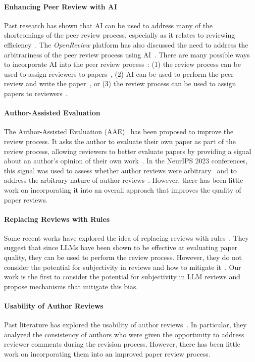 \begin{minipage}[t]{\linewidth}
\paragraph{Enhancing Peer Review with AI} 
Past research has shown that AI can be used to address many of the shortcomings of the peer review process, especially as it relates to reviewing efficiency~\citep{rogers2020can, liu2023reviewergpt}. The \textit{OpenReview} platform has also discussed the need to address the arbitrariness of the peer review process using AI~\cite{tran2020open}. There are many possible ways to incorporate AI into the peer review process~\cite{checco2021ai, kuznetsov2024can}: (1) the review process can be used to assign reviewers to papers~\cite{zhang2022system,mimno2007expertise}, (2) AI can be used to perform the peer review and write the paper~\cite{lu2024ai}, or (3) the review process can be used to assign papers to reviewers~\citep{stelmakh2021novice}. 
\paragraph{Author-Assisted Evaluation}
The Author-Assisted Evaluation (AAE)~\citep{su2021you,wu2023isotonic} has been proposed to
improve the review process. It asks the author to evaluate their own paper as part of the review process, allowing reviewers to better evaluate papers by providing a signal about an author’s opinion of their own work~\citep{centeno2015inaccuracy}. In the NeurIPS 2023 conferences, this signal was used to assess whether author reviews were arbitrary~\citep{beygelzimer2023has} and to address the arbitrary nature of author reviews~\citep{cortes2021inconsistency}. However, there has been little work on incorporating it into an overall approach that improves the quality of paper reviews. 

\paragraph{Replacing Reviews with Rules} 
Some recent works have explored the idea of replacing reviews with rules~\citep{liu2023reviewergpt, xuneurips}. They suggest that since LLMs have been shown to be effective at evaluating paper quality, they can be used to perform the review process. However, they do not consider the potential for subjectivity in reviews and how to mitigate it~\cite{liu2023reviewergpt, xuneurips}. Our work is the first to consider the potential for subjectivity in LLM reviews and propose mechanisms that mitigate this bias.
\paragraph{Usability of Author Reviews} 
Past literature has explored the usability of author reviews~\citep{beygelzimer2023has,cortes2021inconsistency}. In particular, they analyzed the consistency of authors who were given the opportunity to address reviewer comments during the revision process. However, there has been little work on incorporating them into an improved paper review process. 




\end{minipage}
